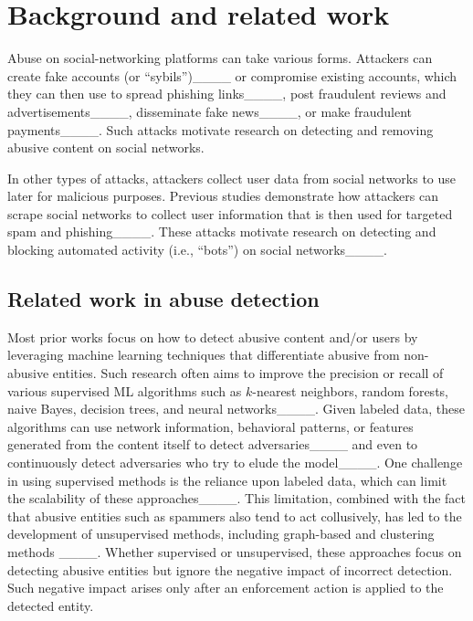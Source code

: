\section{Background and related work}
\label{sec:background}


Abuse on social-networking platforms can take various forms. Attackers can create fake accounts (or ``sybils'')____ or compromise existing accounts, which they can then use to spread phishing links____, post fraudulent reviews and advertisements____, disseminate fake news____, or make fraudulent payments____. Such attacks motivate research on detecting and removing abusive content on social networks. 

In other types of attacks, attackers collect user data from social networks to use later for malicious purposes. Previous studies demonstrate how attackers can scrape social networks to collect user information that is then used for targeted spam and phishing____. These attacks motivate research on detecting and blocking automated activity (i.e., ``bots'') on social networks____.

\subsection{Related work in abuse detection}
\label{sec:related_abuse}

Most prior works focus on how to detect abusive content and/or users by leveraging machine learning techniques that differentiate abusive from non-abusive entities. Such research often aims to improve the precision or recall of various supervised ML algorithms such as $k$-nearest neighbors, random forests, naive Bayes, decision trees, and neural networks____. Given labeled data, these algorithms can use network information, behavioral patterns, or features generated from the content itself to detect adversaries____ and even to continuously detect adversaries who try to elude the model____. One challenge in using supervised methods is the reliance upon labeled data, which can limit the scalability of these approaches____. This limitation, combined with the fact that abusive entities such as spammers also tend to act collusively, has led to the development of unsupervised methods, including graph-based and clustering methods ____. Whether supervised or unsupervised, these approaches focus on detecting abusive entities but ignore the negative impact of incorrect detection. Such negative impact arises only after an enforcement action is applied to the detected entity.

